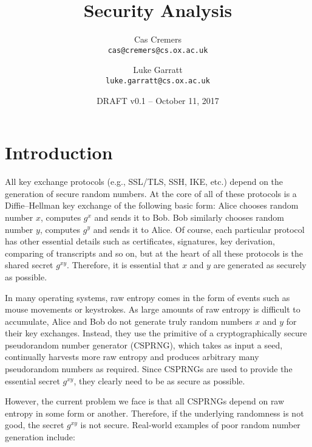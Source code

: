 \documentclass[12pt]{article}
\author{
  Cas Cremers\\
  \texttt{cas@cremers@cs.ox.ac.uk}
  \and
  Luke Garratt\\
  \texttt{luke.garratt@cs.ox.ac.uk}
}
\title{Security Analysis}
\date{DRAFT v0.1 -- October 11, 2017}
\begin{document}
  \maketitle



\section{Introduction}
All key exchange protocols (e.g., SSL/TLS, SSH, IKE, etc.) depend on the generation of secure random numbers. At the core of all of these protocols is a Diffie--Hellman key exchange of the following basic form: Alice chooses random number $x$, computes $g^x$ and sends it to Bob. Bob similarly chooses random number $y$, computes $g^y$ and sends it to Alice. Of course, each particular protocol has other essential details such as certificates, signatures, key derivation, comparing of transcripts and so on, but at the heart of all these protocols is the shared secret $g^{xy}$. Therefore, it is essential that $x$ and $y$ are generated as securely as possible. 

In many operating systems, raw entropy comes in the form of events such as mouse movements or keystrokes. As large amounts of raw entropy is difficult to accumulate, Alice and Bob do not generate truly random numbers $x$ and $y$ for their key exchanges. Instead, they use the primitive of a cryptographically secure pseudorandom number generator (CSPRNG), which takes as input a seed, continually harvests more raw entropy and  produces arbitrary many pseudorandom numbers as required. Since CSPRNGs are used to provide the essential secret $g^{xy}$, they clearly need to be as secure as possible. 

However, the current problem we face is that all CSPRNGs depend on raw entropy in some form or another. Therefore, if the underlying randomness is not good, the secret $g^{xy}$ is not secure. Real-world examples of poor random number generation include:
\end{document}
